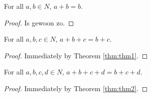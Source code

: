 %

\begin{theorem}
    \label{thm:thm1}
    For all $a,b \in N$, $a + b = b$.
\end{theorem}

\begin{proof} Is gewoon zo.
\end{proof}

\begin{theorem}
    \leanok
    \label{thm:thm2}
    For all $a,b,c \in N$, $a + b + c = b + c$.
\end{theorem}

\begin{proof}  \leanok Immediately by Theorem \ref{thm:thm1}.
\end{proof}

\begin{theorem}
    \leanok
    \label{thm:thm3}
    For all $a, b, c, d \in N$, $a + b + c + d = b + c + d$.
\end{theorem}

\begin{proof} \leanok Immediately by Theorem \ref{thm:thm2}.
\end{proof}